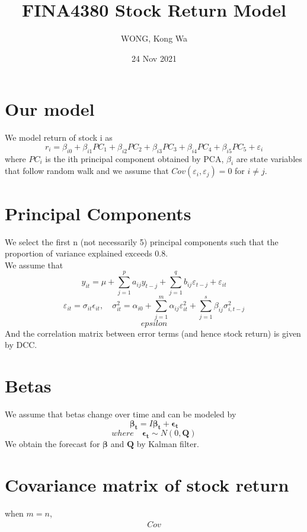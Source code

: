 \documentclass{article}
\title{FINA4380 Stock Return Model}
\author{WONG, Kong Wa}
\date{24 Nov 2021}
\begin{document}
\maketitle
\raggedright
\section{Our model}
We model return of stock i as
\begin{equation*}
	r_i=\beta_{i0}+\beta_{i1}PC_1+\beta_{i2}PC_2+\beta_{i3}PC_3+\beta_{i4}PC_4+\beta_{i5}PC_5+\varepsilon_i
\end{equation*}
where $PC_i$ is the ith principal component obtained by PCA, $\beta_i$ are state variables that follow random walk and we assume that $Cov(\varepsilon_i,\varepsilon_j)=0$ for $i \neq j$.
\section{Principal Components}
We select the first n (not necessarily 5) principal components such that the proportion of variance explained exceeds 0.8. \\
We assume that
\begin{equation*}
	y_{it}=\mu+\sum_{j=1}^p a_{ij} y_{t-j}+\sum_{j=1}^q b_{ij} \varepsilon_{t-j}+\varepsilon_{it}
\end{equation*}
\begin{equation*}
	\varepsilon_{it}=\sigma_{it} \epsilon_{it}, \quad \sigma_{it}^2=\alpha_{i0}+\sum_{j=1}^m \alpha_{ij} \varepsilon_{it}^2+\sum_{j=1}^s \beta_{ij} \sigma_{i,t-j}^2
\end{equation*}
\begin{equation*}
    epsilon
\end{equation*}
And the correlation matrix between error terms (and hence stock return) is given by DCC.
\section{Betas}
We assume that betas change over time and can be modeled by
\begin{equation*}
    \mathbf{\beta_t} = I\mathbf{\beta_t}+\mathbf{\epsilon_t}
\end{equation*}
\begin{equation*}
    where \quad \mathbf{\epsilon_t} \sim N(0,\mathbf{Q})
\end{equation*}
We obtain the forecast for $\mathbf{\beta}$ and $\mathbf{Q}$ by Kalman filter.
\section{Covariance matrix of stock return}
when $m=n$,
\begin{align*}
    Cov
\end{align*}
\end{document}
